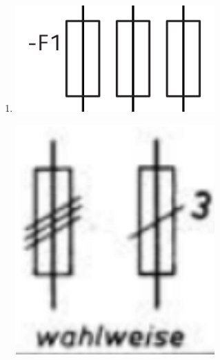 \begin{enumerate}
    \item   {}
        
        \begin{minipage}[t]{0.5\textwidth}
            
                \centering
                \includegraphics[width = 0.6\textwidth]{img/Schmelzsicherungen.png}
            
        \end{minipage}
        \begin{minipage}[t]{0.5\textwidth}
            
                \centering
                \includegraphics[width = 0.6\textwidth]{img/Schmelzsicherungen_einpolige_Darstellung.png}
            
        \end{minipage}
    \clearpage


\end{enumerate}
